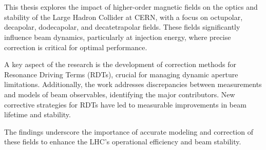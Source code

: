 \chapter{}

This thesis explores the impact of higher-order magnetic fields on the optics and stability of the
Large Hadron Collider at CERN, with a focus on octupolar, decapolar, dodecapolar, and
decatetrapolar fields. These fields significantly influence beam dynamics, particularly at injection
energy, where precise correction is critical for optimal performance.

A key aspect of the research is the development of correction methods for Resonance Driving Terms
(RDTs), crucial for managing dynamic aperture limitations. Additionally, the work addresses
discrepancies between measurements and models of beam observables, identifying the major
contributors. New corrective strategies for RDTs have led to measurable improvements in beam
lifetime and stability.

The findings underscore the importance of accurate modeling and correction of these fields to
enhance the LHC's operational efficiency and beam stability.